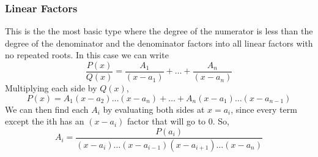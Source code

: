 \subsubsection{Linear Factors}
\noindent
This is the the most basic type where the degree of the numerator is less than the degree of the denominator and the denominator factors into all linear factors with no repeated roots. In this case we can write
\begin{equation*}
	\frac{P(x)}{Q(x)} = \frac{A_1}{(x-a_1)} + \ldots + \frac{A_n}{(x-a_n)}
\end{equation*}
Multiplying each side by $Q(x)$,
\begin{equation*}
	P(x) = A_1(x-a_2) \ldots (x-a_n) + \ldots + A_n(x-a_1) \ldots (x-a_{n-1})
\end{equation*}
We can then find each $A_i$ by evaluating both sides at $x=a_i$, since every term except the ith has an $(x-a_i)$ factor that will go to 0. So,
\begin{equation*}
	A_i = \frac{P(a_i)}{(x-a_i) \ldots (x-a_{i-1})(x-a_{i+1}) \ldots (x-a_n)}
\end{equation*}

\ifodd{}\fi